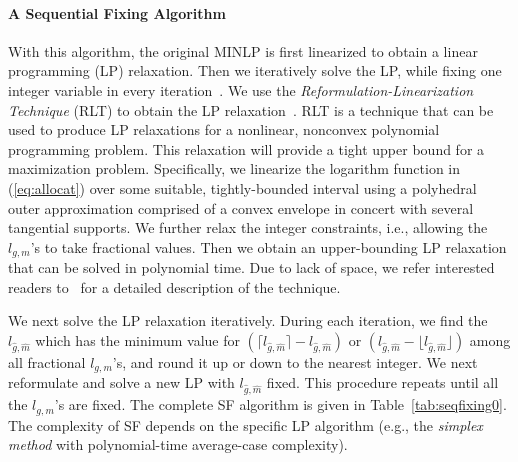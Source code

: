 \documentclass[12pt,onecolumn,draftclsnofoot]{IEEEtran} %
\begin{document}
\paragraph{A Sequential Fixing Algorithm \label{subsubsec:sf}}

With this algorithm, the original MINLP is first linearized to obtain a linear programming (LP) relaxation. Then we iteratively solve the LP, while fixing one integer variable in every iteration~\cite{Hou08, Hou06}. 
We use the {\em Reformulation-Linearization Technique} (RLT) to obtain the LP relaxation~\cite{Kompella09}.  RLT is a technique that can be used to produce LP relaxations for a nonlinear, nonconvex polynomial programming problem. This relaxation will provide a tight upper bound for a maximization problem. Specifically, we linearize the logarithm function in (\ref{eq:allocat}) over some suitable, tightly-bounded interval using a polyhedral outer approximation comprised of a convex envelope in concert with several tangential supports. We further relax the integer constraints, i.e., allowing the $l_{g,m}$'s to take fractional values. Then we obtain an upper-bounding LP relaxation that can be solved in polynomial time. Due to lack of space, we refer interested readers to~\cite{Kompella09} for a detailed description of the technique. 

We next solve the LP relaxation iteratively.  During each iteration, we find the $l_{\hat{g},\hat{m}}$ which has the minimum value for $\left( \lceil l_{\hat{g},\hat{m}} \rceil - l_{\hat{g},\hat{m}} \right)$ or $\left( l_{\hat{g},\hat{m}}-\lfloor l_{\hat{g},\hat{m}} \rfloor \right)$ among all fractional $l_{g,m}$'s, and round it up or down to the nearest integer. We next reformulate and solve a new LP with $l_{\hat{g},\hat{m}}$ fixed. This procedure repeats until all the $l_{g,m}$'s are fixed. The complete SF algorithm is given in Table~\ref{tab:seqfixing0}.  The complexity of SF depends on the specific LP algorithm (e.g., the {\em simplex method} with polynomial-time average-case complexity). 
\end{document}
